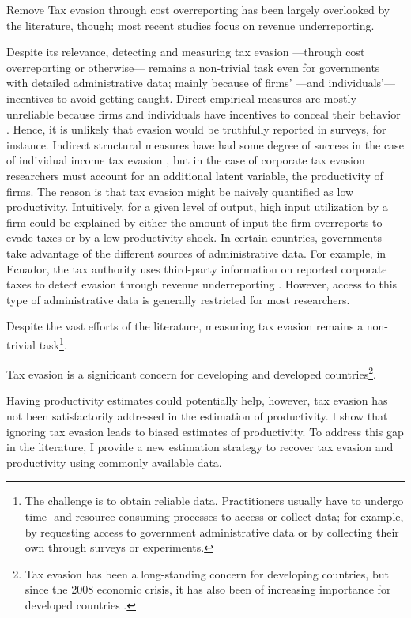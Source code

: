 \documentclass[
  12pt]{article}
\begin{document}
\begin{anfxnote}{Remove}
Tax evasion through cost overreporting has been largely overlooked by
the literature, though; most recent studies focus on revenue
underreporting.

Despite its relevance, detecting and measuring tax evasion ---through
cost overreporting or otherwise--- remains a non-trivial task even for
governments with detailed administrative data; mainly because of firms'
---and individuals'--- incentives to avoid getting caught. Direct
empirical measures are mostly unreliable because firms and individuals
have incentives to conceal their behavior \citep{Slemrod2019}. Hence, it
is unlikely that evasion would be truthfully reported in surveys, for
instance. Indirect structural measures have had some degree of success
in the case of individual income tax evasion \citep{Pissarides1989}, but
in the case of corporate tax evasion researchers must account for an
additional latent variable, the productivity of firms. The reason is
that tax evasion might be naively quantified as low productivity.
Intuitively, for a given level of output, high input utilization by a
firm could be explained by either the amount of input the firm
overreports to evade taxes or by a low productivity shock. In certain
countries, governments take advantage of the different sources of
administrative data. For example, in Ecuador, the tax authority uses
third-party information on reported corporate taxes to detect evasion
through revenue underreporting \citep{Carrillo2017}. However, access to
this type of administrative data is generally restricted for most
researchers.

Despite the vast efforts of the literature, measuring tax evasion
remains a non-trivial task\footnote{The challenge is to obtain reliable
  data. Practitioners usually have to undergo time- and
  resource-consuming processes to access or collect data; for example,
  by requesting access to government administrative data or by
  collecting their own through surveys or experiments.}.

Tax evasion is a significant concern for developing and developed
countries\footnote{Tax evasion has been a long-standing concern for
  developing countries, but since the 2008 economic crisis, it has also
  been of increasing importance for developed countries
  \citep{Slemrod2019}.}.

Having productivity estimates could potentially help, however, tax
evasion has not been satisfactorily addressed in the estimation of
productivity. I show that ignoring tax evasion leads to biased estimates
of productivity. To address this gap in the literature, I provide a new
estimation strategy to recover tax evasion and productivity using
commonly available data.


\end{anfxnote}
\end{document}
